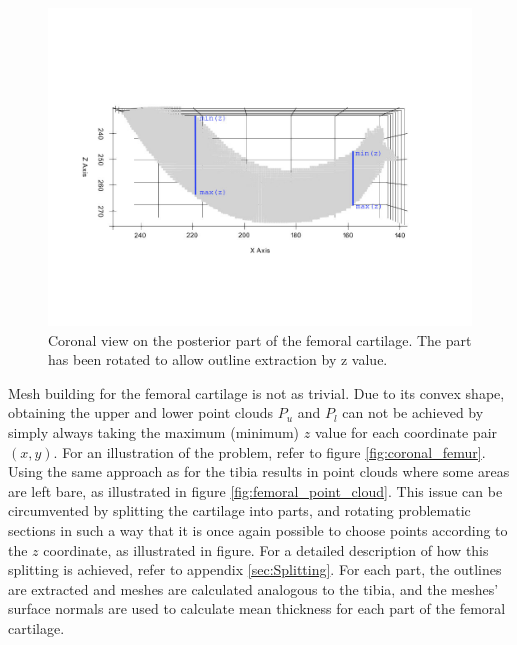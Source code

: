 \begin{figure}[]
	\centering
	\includegraphics[width=\linewidth]{./figures/posterior_femur_yz}
	\caption{Coronal view on the posterior part of the femoral cartilage. The part has been rotated to allow outline extraction by z value.}
	\label{fig:coronal_posterior_femur}
\end{figure}
\par
Mesh building for the femoral cartilage is not as trivial. Due to its convex shape, obtaining the upper and lower point clouds $P_{u}$ and $P_{l}$ can not be achieved by simply always taking the maximum (minimum) $z$ value for each coordinate pair $(x,y)$. For an illustration of the problem, refer to figure \ref{fig:coronal_femur}. Using the same approach as for the tibia results in point clouds where some areas are left bare, as illustrated in figure \ref{fig:femoral_point_cloud}. This issue can be circumvented by splitting the cartilage into parts, and rotating problematic sections in such a way that it is once again possible to choose points according to the $z$ coordinate, as illustrated in figure. For a detailed description of how this splitting is achieved, refer to appendix \ref{sec:Splitting}. For each part, the outlines are extracted and meshes are calculated analogous to the tibia, and the meshes' surface normals are used to calculate mean thickness for each part of the femoral cartilage.
